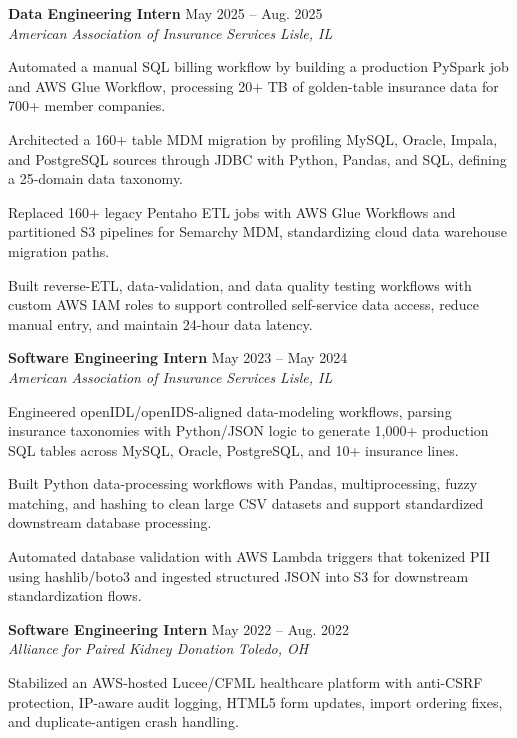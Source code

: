 \documentclass[letterpaper,11pt]{article}
\newcommand{\resumeSubheading}[4]{
  \textbf{#1} \hfill #2\\
  \textit{#3} \hfill \textit{#4}
}
\begin{document}
\resumeSubheading
{Data Engineering Intern}{May 2025 -- Aug. 2025}
{American Association of Insurance Services}{Lisle, IL}
\begin{tightitemize}
  \item Automated a manual SQL billing workflow by building a production PySpark job and AWS Glue Workflow, processing 20+ TB of golden-table insurance data for 700+ member companies.
  \item Architected a 160+ table MDM migration by profiling MySQL, Oracle, Impala, and PostgreSQL sources through JDBC with Python, Pandas, and SQL, defining a 25-domain data taxonomy.
  \item Replaced 160+ legacy Pentaho ETL jobs with AWS Glue Workflows and partitioned S3 pipelines for Semarchy MDM, standardizing cloud data warehouse migration paths.
  \item Built reverse-ETL, data-validation, and data quality testing workflows with custom AWS IAM roles to support controlled self-service data access, reduce manual entry, and maintain 24-hour data latency.
\end{tightitemize}

\resumeSubheading
{Software Engineering Intern}{May 2023 -- May 2024}
{American Association of Insurance Services}{Lisle, IL}
\begin{tightitemize}
  \item Engineered openIDL/openIDS-aligned data-modeling workflows, parsing insurance taxonomies with Python/JSON logic to generate 1,000+ production SQL tables across MySQL, Oracle, PostgreSQL, and 10+ insurance lines.
  \item Built Python data-processing workflows with Pandas, multiprocessing, fuzzy matching, and hashing to clean large CSV datasets and support standardized downstream database processing.
  \item Automated database validation with AWS Lambda triggers that tokenized PII using hashlib/boto3 and ingested structured JSON into S3 for downstream standardization flows.
\end{tightitemize}

\resumeSubheading
{Software Engineering Intern}{May 2022 -- Aug. 2022}
{Alliance for Paired Kidney Donation}{Toledo, OH}
\begin{tightitemize}
  \item Stabilized an AWS-hosted Lucee/CFML healthcare platform with anti-CSRF protection, IP-aware audit logging, HTML5 form updates, import ordering fixes, and duplicate-antigen crash handling.
\end{tightitemize}
\end{document}
